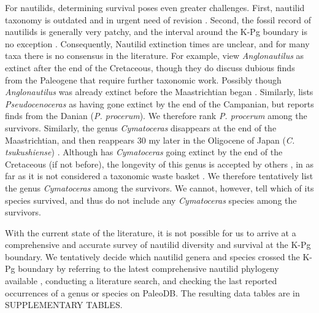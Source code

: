 \documentclass[a4paper]{article}
\begin{document}
For nautilids, determining survival poses even greater challenges. First, nautilid taxonomy is outdated and in urgent need of revision \parencite{lehmannOriginEvolutionaryHistory2017, wardNautilusBiologySystematics2016, wilmsenLateCampanianNautiloids2019, chiratShellMicrostructureMorphogenesis2006}.
Second, the fossil record of nautilids is generally very patchy, and the interval around the K-Pg boundary is no exception \parencite{landmanAmmoniteExtinctionNautilid2014, stilwellRecordsNautiloideaMollusca1996}.
Consequently, Nautilid extinction times are unclear, and for many taxa there is no consensus in the literature. For example, \textcite{baudouinCretaceousNautiloidGenus2021} view \textit{Anglonautilus} as extinct after the end of the Cretaceous, though they do discuss dubious finds from the Paleogene that require further taxonomic work. Possibly though \textit{Anglonautilus} was already extinct before the Maastrichtian began \parencite{lehmannOriginEvolutionaryHistory2017}. Similarly, \textcite{dzikPhylogenyNautiloidea1984} lists \textit{Pseudocenoceras} as having gone extinct by the end of the Campanian, but \textcite{shimansky1975melovye} reports finds from the Danian (\textit{P. procerum}). We therefore rank \textit{P. procerum} among the survivors. Similarly, the genus \textit{Cymatoceras} disappears at the end of the Maastrichtian, and then reappears 30 my later in the Oligocene of Japan (\textit{C. tsukushiense}) \parencite{kobayashi1954new, kummel1956post,matsumoto762CretaceousNautiloids1983}. 
Although \textcite{dzikPhylogenyNautiloidea1984} has \textit{Cymatoceras} going extinct by the end of the Cretaceous (if not before), the longevity of this genus is accepted by others \parencite{barroso-barcenillaUpperHauterivianNautiloids2022, cichowolskiNautiloidGenusCymatoceras2003}, in as far as it is not considered a taxonomic waste basket \parencite{wardNautilusBiologySystematics2016, chiratShellMicrostructureMorphogenesis2006}.
We therefore tentatively list the genus \textit{Cymatoceras} among the survivors. We cannot, however, tell which of its species survived, and thus do not include any \textit{Cymatoceras} species among the survivors. 



With the current state of the literature, it is not possible for us to arrive at a comprehensive and accurate survey of nautilid diversity and survival at the K-Pg boundary. 
We tentatively decide which nautilid genera and species crossed the K-Pg boundary by referring to the latest comprehensive nautilid phylogeny available \parencite{dzikPhylogenyNautiloidea1984}, conducting a literature search, and checking the last reported occurrences of a genus or species on PaleoDB. The resulting data tables are in SUPPLEMENTARY TABLES.
\end{document}
